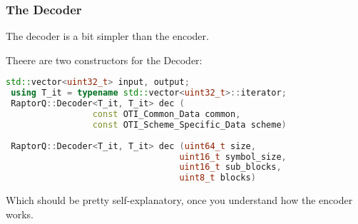 \documentclass[11pt,a4paper]{refart}
\begin{document}
\subsubsection{The Decoder}

The decoder is a bit simpler than the encoder.

Theere are two constructors for the Decoder:

\begin{lstlisting}[language=C++]
 std::vector<uint32_t> input, output;
 using T_it = typename std::vector<uint32_t>::iterator;
 RaptorQ::Decoder<T_it, T_it> dec (
                 const OTI_Common_Data common,
                 const OTI_Scheme_Specific_Data scheme)
                              
 RaptorQ::Decoder<T_it, T_it> dec (uint64_t size,
                                  uint16_t symbol_size,
                                  uint16_t sub_blocks,
                                  uint8_t blocks)
\end{lstlisting}

Which should be pretty self-explanatory, once you understand how the encoder works.
\end{document}
